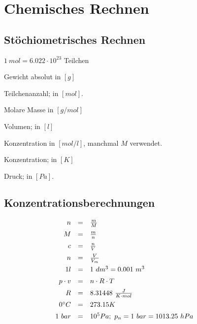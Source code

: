 \section{Chemisches Rechnen}

\subsection{Stöchiometrisches Rechnen}

\begin{definition}[mol]
	$1 \ mol = 6.022 \cdot 10^{23}$ Teilchen
\end{definition}

\begin{definition}[m]
	Gewicht absolut in $[g]$
\end{definition}

\begin{definition}[n]
	Teilchenanzahl; in $[mol]$.
\end{definition}

\begin{definition}[M]
	Molare Masse in $[g/mol]$
\end{definition}

\begin{definition}[V]
	Volumen; in	$[l]$
\end{definition}

\begin{definition}[c]
	Konzentration in $[mol/l]$, manchmal $M$ verwendet.
\end{definition}

\begin{definition}[T]
	Konzentration; in $[K]$
\end{definition}

\begin{definition}[p]
	Druck; in $[Pa]$.
\end{definition}


\subsection{Konzentrationsberechnungen}

{\large
	
$$
\begin{array}{rcll}
n                & = & \frac{m}{M}           &\\[0.5em]
M                & = & \frac{m}{n}    &\\[0.5em]
c                 & = & \frac{n}{V} &\\[0.5em]
n                 & = &\frac{V}{V_m}             &\\[0.5em]
1l                & = & 1\ dm^3=0.001\ m^3         &\\[0.5em]
p \cdot v    & = & n \cdot R \cdot T                       &\\[0.5em]
R                & = & 8.31448 \ \frac{J}{K \cdot mol}                       &\\[0.5em]
0\degree C & = & 273.15K             &\\[0.5em]
1\ bar         & = & 10^5 Pa; \ p_{n} = 1\ bar = 1013.25\ hPa & 
\end{array}
$$

}
